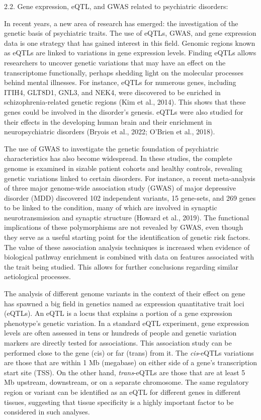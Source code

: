 \documentclass[
]{article}
\begin{document}
2.2. Gene expression, eQTL, and GWAS related to psychiatric disorders:

In recent years, a new area of research has emerged: the investigation
of the genetic basis of psychiatric traits. The use of eQTLs, GWAS, and
gene expression data is one strategy that has gained interest in this
field. Genomic regions known as eQTLs are linked to variations in gene
expression levels. Finding eQTLs allows researchers to uncover genetic
variations that may have an effect on the transcriptome functionally,
perhaps shedding light on the molecular processes behind mental
illnesses. For instance, eQTLs for numerous genes, including ITIH4,
GLT8D1, GNL3, and NEK4, were discovered to be enriched in
schizophrenia-related genetic regions (Kim et al., 2014). This shows
that these genes could be involved in the disorder's genesis. eQTLs were
also studied for their effects in the developing human brain and their
enrichment in neuropsychiatric disorders (Bryois et al., 2022; O'Brien
et al., 2018).

The use of GWAS to investigate the genetic foundation of psychiatric
characteristics has also become widespread. In these studies, the
complete genome is examined in sizable patient cohorts and healthy
controls, revealing genetic variations linked to certain disorders. For
instance, a recent meta-analysis of three major genome-wide association
study (GWAS) of major depressive disorder (MDD) discovered 102
independent variants, 15 gene-sets, and 269 genes to be linked to the
condition, many of which are involved in synaptic neurotransmission and
synaptic structure (Howard et al., 2019). The functional implications of
these polymorphisms are not revealed by GWAS, even though they serve as
a useful starting point for the identification of genetic risk factors.
The value of these association analysis techniques is increased when
evidence of biological pathway enrichment is combined with data on
features associated with the trait being studied. This allows for
further conclusions regarding similar aetiological processes.

The analysis of different genome variants in the context of their effect
on gene has spawned a big field in genetics named as expression
quantitative trait loci (eQTLs). An eQTL is a locus that explains a
portion of a gene expression phenotype's genetic variation. In a
standard eQTL experiment, gene expression levels are often assessed in
tens or hundreds of people and genetic variation markers are directly
tested for associations. This association study can be performed close
to the gene (cis) or far (trans) from it. The \emph{cis}-eQTLs
variations are those that are within 1 Mb (megabase) on either side of a
gene's transcription start site (TSS). On the other hand,
\emph{trans}-eQTLs are those that are at least 5 Mb upstream,
downstream, or on a separate chromosome. The same regulatory region or
variant can be identified as an eQTL for different genes in different
tissues, suggesting that tissue specificity is a highly important factor
to be considered in such analyses. {~}
\end{document}
